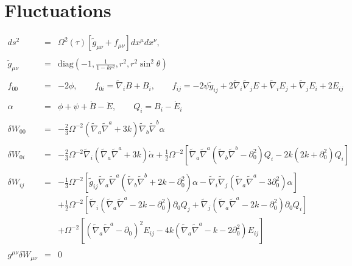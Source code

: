 \documentclass[10pt,letterpaper]{article}
\numberwithin{equation}{section}
\begin{document}
\section{Fluctuations}
%
\begin{eqnarray}
ds^2 &=& \Omega^2(\tau)\left[\tilde g_{\mu\nu}+f_{\mu\nu}\right] dx^\mu dx^\nu,\qquad 
\\ \nonumber\\
\tilde g_{\mu\nu} &=& \text{diag}\left(-1,\frac{1}{1-kr^2},r^2,r^2\sin^2\theta\right)
\\ \nonumber\\
f_{00} &=& -2\phi,\qquad f_{0i} = \tilde\nabla_i B + B_i,\qquad f_{ij} = -2\psi \tilde g_{ij} + 2\tilde\nabla_i\tilde\nabla_j E + 
\tilde\nabla_i E_j +\tilde\nabla_j E_i + 2E_{ij}
\label{svt}
\\ \nonumber\\
\alpha &=& \phi + \psi + \dot B - \ddot E,\qquad Q_i = B_i - \dot E_i
\\ \nonumber\\
\delta W_{00}&=& - \tfrac{2}{3} \Omega^{-2} (\tilde\nabla_a\tilde\nabla^a + 3k)\tilde\nabla_b\tilde\nabla^b \alpha
\\  \nonumber\\ 
\delta W_{0i}&=& -\tfrac23 \Omega^{-2}  \tilde\nabla_i (\tilde\nabla_a\tilde\nabla^a + 3k)\dot\alpha
+\tfrac12 \Omega^{-2}\left[ \tilde\nabla_a\tilde\nabla^a (\tilde\nabla_b \tilde\nabla^b-\partial_0^2)Q_i -2k(2k+\partial_0^2)Q_i\right]
\\  \nonumber\\ 
\delta W_{ij}&=& -\tfrac{1}{3} \Omega^{-2} \left[ \tilde g_{ij} \tilde\nabla_a\tilde\nabla^a (\tilde\nabla_b \tilde\nabla^b +2k-\partial_0^2)\alpha - \tilde\nabla_i\tilde\nabla_j(\tilde\nabla_a\tilde\nabla^a - 3\partial_0^2)\alpha \right]
\nonumber\\
&& +\tfrac12 \Omega^{-2} \left[ \tilde\nabla_i ( \tilde\nabla_a\tilde\nabla^a -2k-\partial_0^2) \partial_0 Q_j 
+  \tilde\nabla_j ( \tilde\nabla_a\tilde\nabla^a -2k-\partial_0^2) \partial_0 Q_i\right]
\nonumber\\
&&+ \Omega^{-2}\left[ (\tilde\nabla_a\tilde\nabla^a-\partial_0)^2 E_{ij} - 4k (\tilde\nabla_a\tilde\nabla^a - k-2\partial_0^2)E_{ij} \right]
\\  \nonumber\\ 
g^{\mu\nu}\delta W_{\mu\nu}&=& 0
\end{eqnarray}

\end{document}
